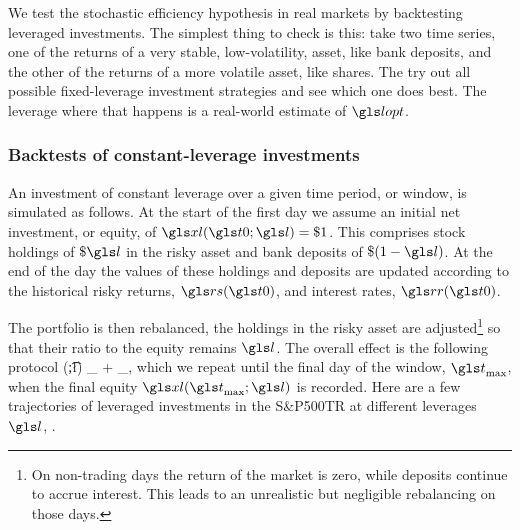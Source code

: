 We test the stochastic efficiency hypothesis in real markets by backtesting leveraged investments. The simplest thing to check is this: take two time series, one of the returns of a very stable, low-volatility, asset, like bank deposits, and the other of the returns of a more volatile asset, like shares. The try out all possible fixed-leverage investment strategies and see which one does best. The leverage where that happens is a real-world estimate of $\lopt$.

\subsubsection{Backtests of constant-leverage investments}
An investment of constant leverage over a given time period, or window, is simulated as follows. At the start of the first day we assume an initial net investment, or equity, of $\xl(\tn;\l)=\$1$. This comprises stock holdings of $\$\l$ in the risky asset and bank deposits of $\$(1-\l)$. At the end of the day the values of these holdings and deposits are updated according to the historical risky returns, $\rs(\tn)$, and interest rates, $\rr(\tn)$. 

The portfolio is then rebalanced, \ie the holdings in the risky asset are adjusted\footnote{On non-trading days the return of the market is zero, while deposits continue to accrue interest. This leads to an unrealistic but negligible rebalancing on those days.} so that their ratio to the equity remains $\l$. The overall effect is the following protocol 
\be
\xl(\t;\l) \to \underbrace{\l \xl(\t;\l) \rs(\t)}_{} + _{},
\ee
which we repeat until the final day of the window, $\t_{\text{max}}$, when the final equity $\xl(\t_{\text{max}};\l)$ is recorded. 
Here are a few trajectories of leveraged investments in the S\&P500TR at different leverages $\l$, .

